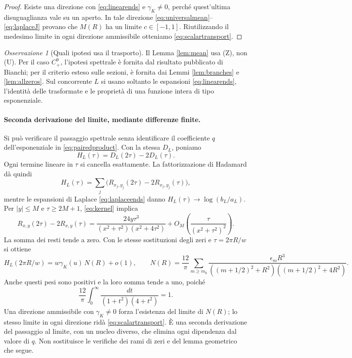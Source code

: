 \documentclass[11pt,a4paper]{article}
\theoremstyle{remark}
\newtheorem*{remark}{Osservazione}
\begin{document}
\begin{proof}
Esiste una direzione con \eqref{eq:linearends} e $\gamma_K\ne0$, perché
quest'ultima disuguaglianza vale su un aperto. In tale direzione
\eqref{eq:universalmean}--\eqref{eq:laplaceJ} provano che $M(R)$ ha un
limite $c\in[-1,1]$. Riutilizzando il medesimo limite in ogni direzione
ammissibile otteniamo \eqref{eq:scalartransport}.
\end{proof}

\begin{remark}[Quali ipotesi usa il trasporto]
Il Lemma \ref{lem:mean} usa (Z), non (U). Per il caso $C^9_+$,
l'ipotesi spettrale è fornita dal risultato pubblicato di Bianchi;
per il criterio esteso sulle sezioni, è fornita dai Lemmi
\ref{lem:branches} e \ref{lem:allzeros}. Sul concorrente $L$ si usano
soltanto le espansioni \eqref{eq:linearends}, l'identità delle
trasformate e le proprietà di una funzione intera di tipo esponenziale.
\end{remark}

\paragraph{Seconda derivazione del limite, mediante differenze finite.}
Si può verificare il passaggio spettrale senza identificare il
coefficiente $q$ dell'esponenziale in \eqref{eq:pairedproduct}.
Con la stessa $D_L$, poniamo
\[
H_L(\tau)=D_L(2\tau)-2D_L(\tau).
\]
Ogni termine lineare in $\tau$ si cancella esattamente. La
fattorizzazione di Hadamard dà quindi
\[
H_L(\tau)=\sum_j\bigl(R_{x_j,y_j}(2\tau)-2R_{x_j,y_j}(\tau)\bigr),
\]
mentre le espansioni di Laplace \eqref{eq:laplaceends} danno
$H_L(\tau)\to\log(b_L/a_L)$.
Per $|y|\leq M$ e $\tau\geq2M+1$, \eqref{eq:kernel} implica
\[
R_{x,y}(2\tau)-2R_{x,y}(\tau)
=\frac{24y\tau^3}{(x^2+\tau^2)(x^2+4\tau^2)}
+O_M\!\left(\frac{\tau}{(x^2+\tau^2)^2}\right).
\]
La somma dei resti tende a zero. Con le stesse sostituzioni degli
zeri e $\tau=2\pi R/w$ si ottiene
\[
H_L(2\pi R/w)=w\gamma_K(u)\,N(R)+o(1),\qquad
N(R)=\frac{12}{\pi}\sum_{m\geq m_0}
\frac{\epsilon_m R^3}
{((m+1/2)^2+R^2)((m+1/2)^2+4R^2)}.
\]
Anche questi pesi sono positivi e la loro somma tende a uno, poiché
\[
\frac{12}{\pi}\int_0^\infty
\frac{dt}{(1+t^2)(4+t^2)}=1.
\]
Una direzione ammissibile con $\gamma_K\ne0$ forza l'esistenza del
limite di $N(R)$; lo stesso limite in ogni direzione ridà
\eqref{eq:scalartransport}. È una seconda derivazione del passaggio
al limite, con un nucleo diverso, che elimina ogni dipendenza dal
valore di $q$. Non sostituisce le verifiche dei rami di zeri e del
lemma geometrico che segue.
\end{document}
